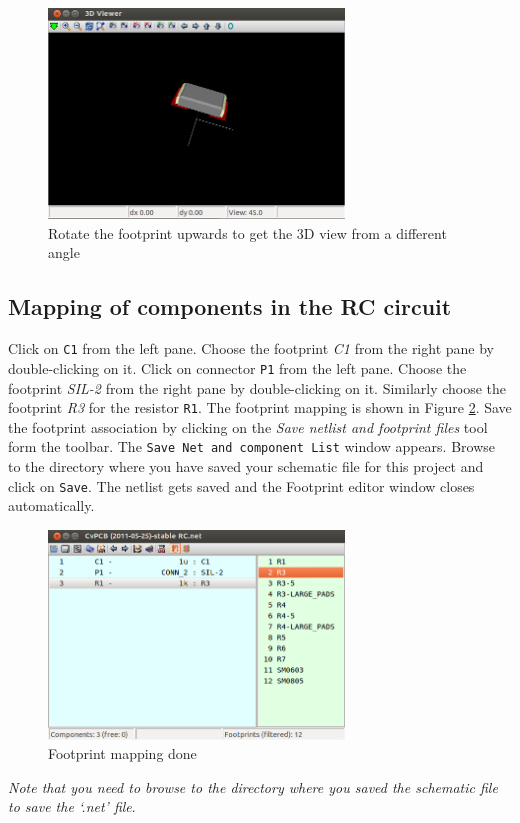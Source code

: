 \begin{figure}
\centering
\includegraphics[width=0.7\textwidth]{figures/3dv}
\caption{Rotate the footprint upwards to get the 3D view from a different angle}
\label{3dv}
\end{figure}
\subsection{Mapping of components in the RC circuit}
Click on {\tt C1} from the left pane. Choose the footprint \textit{C1} from the right pane by double-clicking on it. Click on connector {\tt P1} from the left pane. Choose the footprint \textit{SIL-2} from the right pane by double-clicking on it. Similarly choose the footprint \textit{R3} for the resistor {\tt R1}. The footprint mapping is shown in Figure \ref{map}. Save the footprint association by clicking on the \textit{Save netlist and footprint files} tool form the toolbar. The {\tt Save Net and component List} window appears. Browse to the directory where you have saved your schematic file for this project and click on {\tt Save}. The netlist gets saved and the Footprint editor window closes automatically.

\begin{figure}
\centering
\includegraphics[width=0.7\textwidth]{figures/map}
\caption{Footprint mapping done}
\label{map}
\end{figure}
\textit{Note that you need to browse to the directory where you saved the schematic file to save the `.net' file}.
